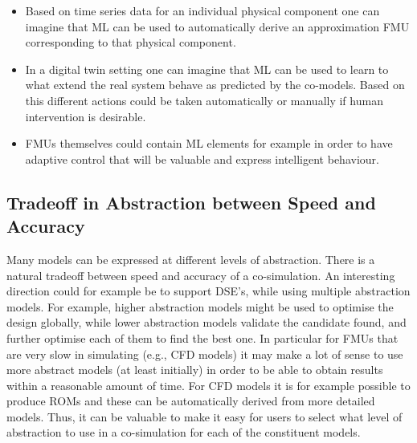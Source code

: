 \begin{itemize}
\item Based on time series data for an individual physical component one can imagine that ML can be used to automatically derive an approximation FMU corresponding to that physical component.
\item In a digital twin setting one can imagine that ML can be used to learn to what extend the real system behave as predicted by the co-models. Based on this different actions could be taken automatically or manually if human intervention is desirable.
\item FMUs themselves could contain ML elements for example in order to have adaptive control that will be valuable and express intelligent behaviour.
\end{itemize}


\subsection{Tradeoff in Abstraction between Speed and Accuracy}

Many models can be expressed at different levels of abstraction. There is a natural tradeoff between speed and accuracy of a co-simulation. 
An interesting direction could for example be to support DSE's, while using multiple abstraction models.
For example, higher abstraction models might be used to optimise the design globally, while lower abstraction models validate the candidate found, and further optimise each of them to find the best one. In particular for FMUs that are very slow in simulating (e.g., CFD models) it may make a lot of sense to use more abstract models (at least initially) in order to be able to obtain results within a reasonable amount of time. For CFD models it is for example possible to produce ROMs and these can be automatically derived from more detailed models. Thus, it can be valuable to make it easy for users to select what level of abstraction to use in a co-simulation for each of the constituent models.


